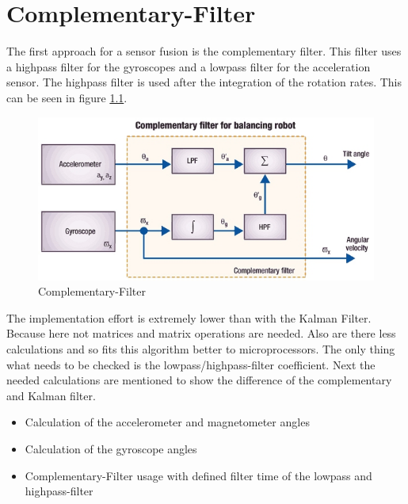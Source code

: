\chapter{Complementary-Filter}
\label{chap:ComplementaryFilter}

The first approach for a sensor fusion is the complementary filter. This filter uses a highpass filter for the gyroscopes and a lowpass filter for the acceleration sensor. The highpass filter is used after the integration of the rotation rates. This can be seen in figure \ref{fig:complementary}.\\
\begin{figure}[H]
	\centering\includegraphics[width=1\textwidth]{fig/Complementary.jpg}
	\caption{Complementary-Filter\cite{doc:STM}}
	\label{fig:complementary}
\end{figure}
The implementation effort is extremely lower than with the Kalman Filter. Because here not matrices and matrix operations are needed. Also are there less calculations and so fits this algorithm better to microprocessors. The only thing what needs to be checked is the lowpass/highpass-filter coefficient. Next the needed calculations are mentioned to show the difference of the complementary and Kalman filter.
\begin{itemize}
	\item Calculation of the accelerometer and magnetometer angles
	\item Calculation of the gyroscope angles
	\item Complementary-Filter usage with defined filter time of the lowpass and highpass-filter
\end{itemize}